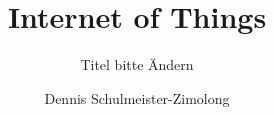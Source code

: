 \title{Internet of Things}
\subtitle{Titel bitte Ändern}
\author{Dennis Schulmeister-Zimolong}

\renewcommand{\ubInstitute}{Studiengang Mechatronik}
\renewcommand{\ubModule}{Internet of Things}
\renewcommand{\ubType}{Aufgaben}

